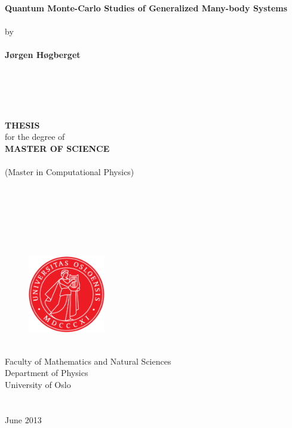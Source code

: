 \begin{titlepage}
\begin{center}
\ \\
\ \\
\ \\
{\huge \bf Quantum Monte-Carlo Studies of Generalized Many-body Systems}\\ 
\ \\ 
{\Large by}\\
\ \\
{\Large \bf J\o{}rgen H\o{}gberget}\\
\ \\
\ \\
\ \\
\ \\
\ \\
{\large \bf THESIS}\\
{\large for the degree of}\\
{\large \bf MASTER OF SCIENCE}\\
\ \\
(Master in Computational Physics)\\
\ \\
\ \\
\ \\
\ \\
\ \\
\ \\
\begin{figure}[h!]
\begin{center}
\includegraphics[width=0.3\textwidth]{../Graphics/UiO_Segl_300dpi.png}
\end{center}
\end{figure}
\ \\
\Large{\rm Faculty of Mathematics and Natural Sciences}\\
{\rm Department of Physics}\\
{\rm University of Oslo}\\
\ \\
\ \\
{\rm June 2013}
\end{center}
\end{titlepage}
